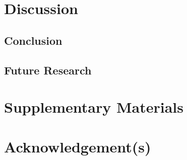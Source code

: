 \documentclass[]{interact}
\theoremstyle{plain}%
\theoremstyle{definition}
\theoremstyle{remark}
\begin{document}
\hypertarget{discussion}{%
\section{Discussion}\label{discussion}}

\hypertarget{conclusion}{%
\subsection{Conclusion}\label{conclusion}}

\hypertarget{future-research}{%
\subsection{Future Research}\label{future-research}}

\hypertarget{supplementary-materials}{%
\section*{Supplementary Materials}\label{supplementary-materials}}

\hypertarget{acknowledgements}{%
\section*{Acknowledgement(s)}\label{acknowledgements}}



\end{document}
